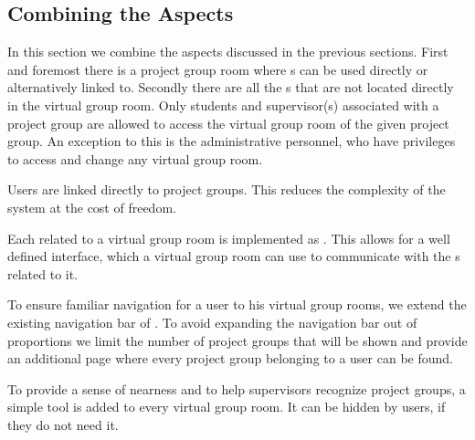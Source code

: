 \subsection{Combining the Aspects}
In this section we combine the aspects discussed in the previous sections.
First and foremost there is a project group room where \detdeandrelaver[]s can be used directly or alternatively linked to.
Secondly there are all the \detdeandrelaver[]s that are not located directly in the virtual group room.
Only students and supervisor(s) associated with a project group are allowed to access the virtual group room of the given project group.
An exception to this is the administrative personnel, who have privileges to access and change any virtual group room.

Users are linked directly to project groups.
This reduces the complexity of the system at the cost of freedom.

Each \detdeandrelaver{} related to a virtual group room is implemented as \block{}.
This allows for a well defined interface, which a virtual group room can use to communicate with the \detdeandrelaver[]s related to it.

To ensure familiar navigation for a user to his virtual group rooms, we extend the existing navigation bar of \moodle{}.
To avoid expanding the navigation bar out of proportions we limit the number of project groups that will be shown and provide an additional page where every project group belonging to a user can be found.

To provide a sense of nearness and to help supervisors recognize project groups, a simple tool is added to every virtual group room.
It can be hidden by users, if they do not need it.













\FloatBarrier